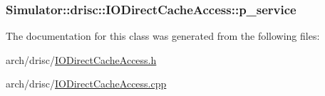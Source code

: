 \hypertarget{class_simulator_1_1drisc_1_1_i_o_direct_cache_access_afe74bccc44d774cb6a96bfa07a35ed63}{
\subsubsection[{p\+\_\+service}]{ Simulator\+::drisc\+::\+I\+O\+Direct\+Cache\+Access\+::p\+\_\+service}}\label{class_simulator_1_1drisc_1_1_i_o_direct_cache_access_afe74bccc44d774cb6a96bfa07a35ed63}


The documentation for this class was generated from the following files\+:\begin{DoxyCompactItemize}
\item 
arch/drisc/\hyperlink{_i_o_direct_cache_access_8h}{I\+O\+Direct\+Cache\+Access.\+h}\item 
arch/drisc/\hyperlink{_i_o_direct_cache_access_8cpp}{I\+O\+Direct\+Cache\+Access.\+cpp}\end{DoxyCompactItemize}
